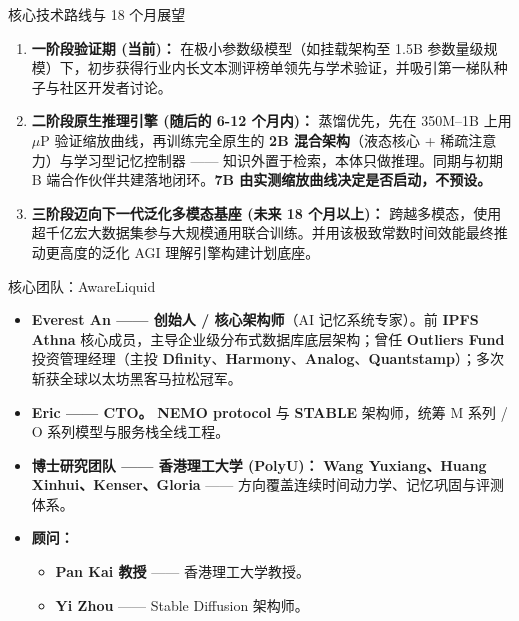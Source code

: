 \documentclass[aspectratio=169, 10pt]{beamer}
\begin{document}
\begin{frame}{核心技术路线与 18 个月展望}
\begin{enumerate}
    \item \textbf{一阶段验证期 (当前)：} 在极小参数级模型（如挂载架构至 1.5B 参数量级规模）下，初步获得行业内长文本测评榜单领先与学术验证，并吸引第一梯队种子与社区开发者讨论。
    \vspace{0.5em}
    \item \textbf{二阶段原生推理引擎 (随后的 6-12 个月内)：} 蒸馏优先，先在 350M--1B 上用 $\mu$P 验证缩放曲线，再训练完全原生的 \textbf{2B 混合架构}（液态核心 + 稀疏注意力）与学习型记忆控制器 —— 知识外置于检索，本体只做推理。同期与初期 B 端合作伙伴共建落地闭环。\textbf{7B 由实测缩放曲线决定是否启动，不预设。}
    \vspace{0.5em}
    \item \textbf{三阶段迈向下一代泛化多模态基座 (未来 18 个月以上)：} 跨越多模态，使用超千亿宏大数据集参与大规模通用联合训练。并用该极致常数时间效能最终推动更高度的泛化 AGI 理解引擎构建计划底座。
\end{enumerate}
\end{frame}

\begin{frame}{核心团队：AwareLiquid}
\small
\begin{itemize}\itemsep=0.4em
    \item \textbf{Everest An —— 创始人 / 核心架构师}（AI 记忆系统专家）。前 \textbf{IPFS Athna} 核心成员，主导企业级分布式数据库底层架构；曾任 \textbf{Outliers Fund} 投资管理经理（主投 \textbf{Dfinity}、\textbf{Harmony}、\textbf{Analog}、\textbf{Quantstamp}）；多次斩获全球以太坊黑客马拉松冠军。
    \item \textbf{Eric —— CTO。} \textbf{NEMO protocol} 与 \textbf{STABLE} 架构师，统筹 M 系列 / O 系列模型与服务栈全线工程。
    \item \textbf{博士研究团队 —— 香港理工大学 (PolyU)：} \textbf{Wang Yuxiang、Huang Xinhui、Kenser、Gloria} —— 方向覆盖连续时间动力学、记忆巩固与评测体系。
    \vspace{0.3em}
    \item \textbf{顾问：}
    \begin{itemize}
        \item \textbf{Pan Kai 教授} —— 香港理工大学教授。
        \item \textbf{Yi Zhou} —— Stable Diffusion 架构师。
    \end{itemize}
\end{itemize}
\end{frame}
\end{document}
